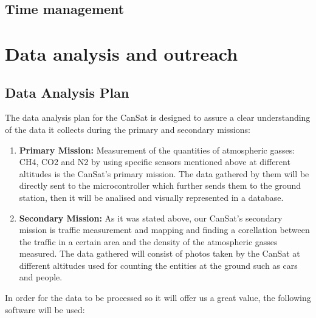 \documentclass[11pt]{article}
\begin{document}
\subsection{Time management}




\section{Data analysis and outreach}

\subsection{Data Analysis Plan}
\hspace{0.5cm} The data analysis plan for the CanSat is designed to assure a clear understanding of the data it collects during the primary and secondary missions:
\begin{enumerate}
\item \textbf{Primary Mission:} Measurement of the quantities of atmospheric gasses: CH4, CO2 and N2 by using specific sensors mentioned above at different altitudes is the CanSat's primary mission. The data gathered by them will be directly sent to the microcontroller which further sends them to the ground station, then it will be analised and visually represented in a database.
\item \textbf{Secondary Mission:} As it was stated above, our CanSat's secondary mission is traffic measurement and mapping and finding a corellation between the traffic in a certain area and the density of the atmospheric gasses measured. The data gathered will consist of photos taken by the CanSat at different altitudes used for counting the entities at the ground such as cars and people.
\end {enumerate}
\hspace{0.5cm} In order for the data to be processed so it will offer us a great value, the following software will be used:
\end{document}
